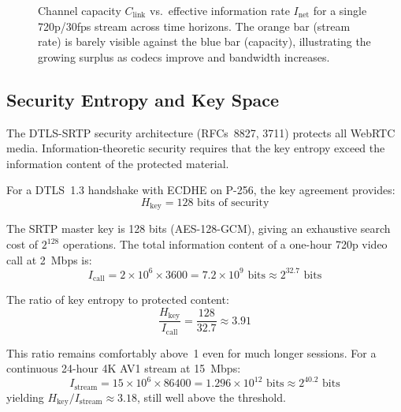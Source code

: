 \begin{figure}[ht]
\caption{Channel capacity $C_{\text{link}}$ vs.\ effective information rate
  $I_{\text{net}}$ for a single 720p/30fps stream across time horizons. The
  orange bar (stream rate) is barely visible against the blue bar (capacity),
  illustrating the growing surplus as codecs improve and bandwidth increases.}
\label{fig:inet-capacity}
\end{figure}

\subsection{Security Entropy and Key Space}

The DTLS-SRTP security architecture (RFCs~8827, 3711) protects all
WebRTC media. Information-theoretic security requires that the key
entropy exceed the information content of the protected material.

For a DTLS~1.3 handshake with ECDHE on P-256, the key agreement
provides:
\begin{equation}
  H_{\text{key}} = 128 \text{~bits of security}
  \label{eq:key-entropy}
\end{equation}

The SRTP master key is 128 bits (AES-128-GCM), giving an exhaustive
search cost of $2^{128}$ operations. The total information content of a
one-hour 720p video call at 2~Mbps is:
\begin{equation}
  I_{\text{call}} = 2 \times 10^6 \times 3600
    = 7.2 \times 10^9 \text{~bits}
    \approx 2^{32.7} \text{~bits}
  \label{eq:call-content}
\end{equation}

The ratio of key entropy to protected content:
\begin{equation}
  \frac{H_{\text{key}}}{I_{\text{call}}}
    = \frac{128}{32.7} \approx 3.91
  \label{eq:security-margin}
\end{equation}

This ratio remains comfortably above~1 even for much longer sessions.
For a continuous 24-hour 4K AV1 stream at 15~Mbps:
\begin{equation}
  I_{\text{stream}} = 15 \times 10^6 \times 86400
    = 1.296 \times 10^{12} \text{~bits}
    \approx 2^{40.2} \text{~bits}
\end{equation}
yielding $H_{\text{key}} / I_{\text{stream}} \approx 3.18$, still
well above the threshold.

